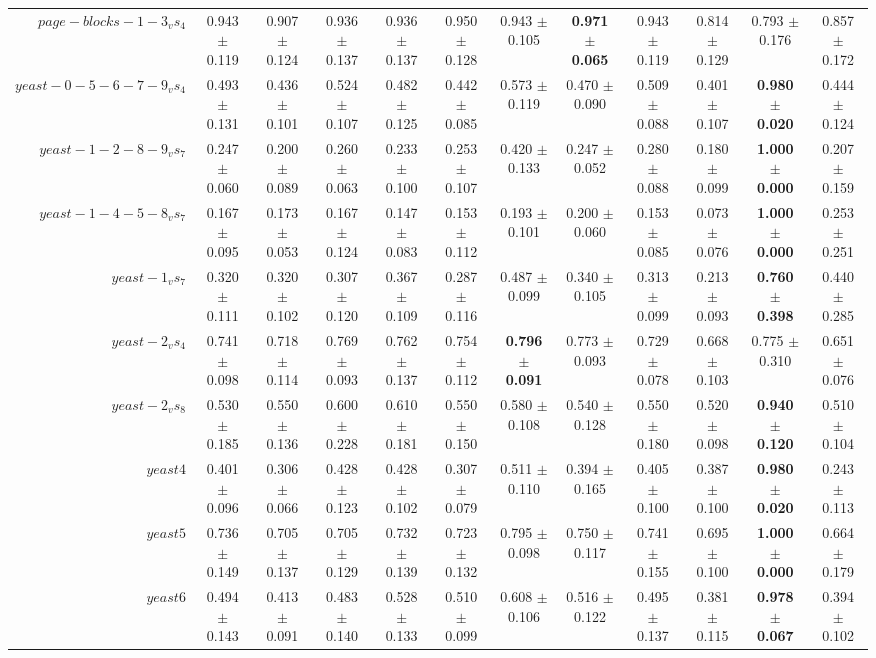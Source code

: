 \begin{table}[!ht]
{\begin{tabular}{r c c c c c c c c c c c}
$page-blocks-1-3_vs_4$ & 0.943 $\pm$ 0.119 & 0.907 $\pm$ 0.124 & 0.936 $\pm$ 0.137 & 0.936 $\pm$ 0.137 & 0.950 $\pm$ 0.128 & 0.943 $\pm$ 0.105 & \textbf{0.971 $\pm$ 0.065} & 0.943 $\pm$ 0.119 & 0.814 $\pm$ 0.129 & 0.793 $\pm$ 0.176 & 0.857 $\pm$ 0.172 \\
$yeast-0-5-6-7-9_vs_4$ & 0.493 $\pm$ 0.131 & 0.436 $\pm$ 0.101 & 0.524 $\pm$ 0.107 & 0.482 $\pm$ 0.125 & 0.442 $\pm$ 0.085 & 0.573 $\pm$ 0.119 & 0.470 $\pm$ 0.090 & 0.509 $\pm$ 0.088 & 0.401 $\pm$ 0.107 & \textbf{0.980 $\pm$ 0.020} & 0.444 $\pm$ 0.124 \\
$yeast-1-2-8-9_vs_7$ & 0.247 $\pm$ 0.060 & 0.200 $\pm$ 0.089 & 0.260 $\pm$ 0.063 & 0.233 $\pm$ 0.100 & 0.253 $\pm$ 0.107 & 0.420 $\pm$ 0.133 & 0.247 $\pm$ 0.052 & 0.280 $\pm$ 0.088 & 0.180 $\pm$ 0.099 & \textbf{1.000 $\pm$ 0.000} & 0.207 $\pm$ 0.159 \\
$yeast-1-4-5-8_vs_7$ & 0.167 $\pm$ 0.095 & 0.173 $\pm$ 0.053 & 0.167 $\pm$ 0.124 & 0.147 $\pm$ 0.083 & 0.153 $\pm$ 0.112 & 0.193 $\pm$ 0.101 & 0.200 $\pm$ 0.060 & 0.153 $\pm$ 0.085 & 0.073 $\pm$ 0.076 & \textbf{1.000 $\pm$ 0.000} & 0.253 $\pm$ 0.251 \\
$yeast-1_vs_7$ & 0.320 $\pm$ 0.111 & 0.320 $\pm$ 0.102 & 0.307 $\pm$ 0.120 & 0.367 $\pm$ 0.109 & 0.287 $\pm$ 0.116 & 0.487 $\pm$ 0.099 & 0.340 $\pm$ 0.105 & 0.313 $\pm$ 0.099 & 0.213 $\pm$ 0.093 & \textbf{0.760 $\pm$ 0.398} & 0.440 $\pm$ 0.285 \\
$yeast-2_vs_4$ & 0.741 $\pm$ 0.098 & 0.718 $\pm$ 0.114 & 0.769 $\pm$ 0.093 & 0.762 $\pm$ 0.137 & 0.754 $\pm$ 0.112 & \textbf{0.796 $\pm$ 0.091} & 0.773 $\pm$ 0.093 & 0.729 $\pm$ 0.078 & 0.668 $\pm$ 0.103 & 0.775 $\pm$ 0.310 & 0.651 $\pm$ 0.076 \\
$yeast-2_vs_8$ & 0.530 $\pm$ 0.185 & 0.550 $\pm$ 0.136 & 0.600 $\pm$ 0.228 & 0.610 $\pm$ 0.181 & 0.550 $\pm$ 0.150 & 0.580 $\pm$ 0.108 & 0.540 $\pm$ 0.128 & 0.550 $\pm$ 0.180 & 0.520 $\pm$ 0.098 & \textbf{0.940 $\pm$ 0.120} & 0.510 $\pm$ 0.104 \\
$yeast4$ & 0.401 $\pm$ 0.096 & 0.306 $\pm$ 0.066 & 0.428 $\pm$ 0.123 & 0.428 $\pm$ 0.102 & 0.307 $\pm$ 0.079 & 0.511 $\pm$ 0.110 & 0.394 $\pm$ 0.165 & 0.405 $\pm$ 0.100 & 0.387 $\pm$ 0.100 & \textbf{0.980 $\pm$ 0.020} & 0.243 $\pm$ 0.113 \\
$yeast5$ & 0.736 $\pm$ 0.149 & 0.705 $\pm$ 0.137 & 0.705 $\pm$ 0.129 & 0.732 $\pm$ 0.139 & 0.723 $\pm$ 0.132 & 0.795 $\pm$ 0.098 & 0.750 $\pm$ 0.117 & 0.741 $\pm$ 0.155 & 0.695 $\pm$ 0.100 & \textbf{1.000 $\pm$ 0.000} & 0.664 $\pm$ 0.179 \\
$yeast6$ & 0.494 $\pm$ 0.143 & 0.413 $\pm$ 0.091 & 0.483 $\pm$ 0.140 & 0.528 $\pm$ 0.133 & 0.510 $\pm$ 0.099 & 0.608 $\pm$ 0.106 & 0.516 $\pm$ 0.122 & 0.495 $\pm$ 0.137 & 0.381 $\pm$ 0.115 & \textbf{0.978 $\pm$ 0.067} & 0.394 $\pm$ 0.102 \\

\end{tabular}}
\end{table}
